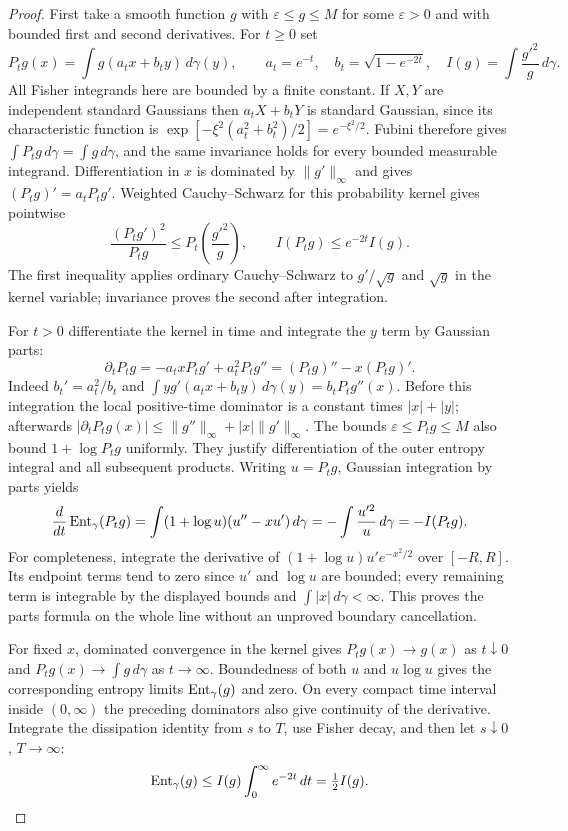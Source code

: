 \documentclass[11pt]{article}
\begin{document}
\begin{proof}
First take a smooth function $g$ with $\varepsilon\leq g\leq M$
for some $\varepsilon>0$ and with bounded first and second derivatives.
For $t\geq0$ set
\[
 P_tg(x)=\int g(a_tx+b_ty)\,d\gamma(y),\qquad
 a_t=e^{-t},\quad b_t=\sqrt{1-e^{-2t}},\quad
 I(g)=\int\frac{g'^2}{g}\,d\gamma.
\]
All Fisher integrands here are bounded by a finite constant.
If $X,Y$ are independent standard Gaussians then $a_tX+b_tY$ is
standard Gaussian, since its characteristic function is
$\exp[-\xi^2(a_t^2+b_t^2)/2]=e^{-\xi^2/2}$.
Fubini therefore gives $\int P_tg\,d\gamma=\int g\,d\gamma$,
and the same invariance holds for every bounded measurable integrand.
Differentiation in $x$ is dominated by $\|g'\|_\infty$ and gives
$(P_tg)'=a_tP_tg'$. Weighted Cauchy--Schwarz for this probability
kernel gives pointwise
\[
 \frac{(P_tg')^2}{P_tg}\leq P_t\left(\frac{g'^2}{g}\right),
 \qquad I(P_tg)\leq e^{-2t}I(g).
\]
The first inequality applies ordinary Cauchy--Schwarz to
$g'/\sqrt g$ and $\sqrt g$ in the kernel variable; invariance proves
the second after integration.

For $t>0$ differentiate the kernel in time and integrate the $y$ term
by Gaussian parts:
\[
 \partial_t P_tg=-a_txP_tg'+a_t^2P_tg''
 =(P_tg)''-x(P_tg)'.
\]
Indeed $b_t'=a_t^2/b_t$ and
$\int y g'(a_tx+b_ty)\,d\gamma(y)=b_tP_tg''(x)$.
Before this integration the local positive-time dominator is a
constant times $|x|+|y|$; afterwards
$|\partial_tP_tg(x)|\leq\|g''\|_\infty+|x|\|g'\|_\infty$.
The bounds $\varepsilon\leq P_tg\leq M$ also bound
$1+\log P_tg$ uniformly. They justify differentiation of the outer
entropy integral and all subsequent products. Writing $u=P_tg$,
Gaussian integration by parts yields
\[
 \frac d{dt}\operatorname{Ent}_\gamma(P_tg)
 =\int(1+\log u)(u''-xu')\,d\gamma
 =-\int\frac{u'^2}{u}\,d\gamma=-I(P_tg).
\]
For completeness, integrate the derivative of
$(1+\log u)u'e^{-x^2/2}$ over $[-R,R]$.
Its endpoint terms tend to zero since $u'$ and $\log u$ are bounded;
every remaining term is integrable by the displayed bounds and
$\int|x|\,d\gamma<\infty$. This proves the parts formula on the
whole line without an unproved boundary cancellation.

For fixed $x$, dominated convergence in the kernel gives
$P_tg(x)\to g(x)$ as $t\downarrow0$ and
$P_tg(x)\to\int g\,d\gamma$ as $t\to\infty$.
Boundedness of both $u$ and $u\log u$ gives the corresponding entropy
limits $\operatorname{Ent}_\gamma(g)$ and zero. On every compact time interval
inside $(0,\infty)$ the preceding dominators also give continuity of
the derivative. Integrate the dissipation identity from $s$ to $T$,
use Fisher decay, and then let $s\downarrow0$, $T\to\infty$:
\[
 \operatorname{Ent}_\gamma(g)\leq I(g)\int_0^\infty e^{-2t}\,dt
 =\tfrac12 I(g).
\]


\end{proof}
\end{document}
